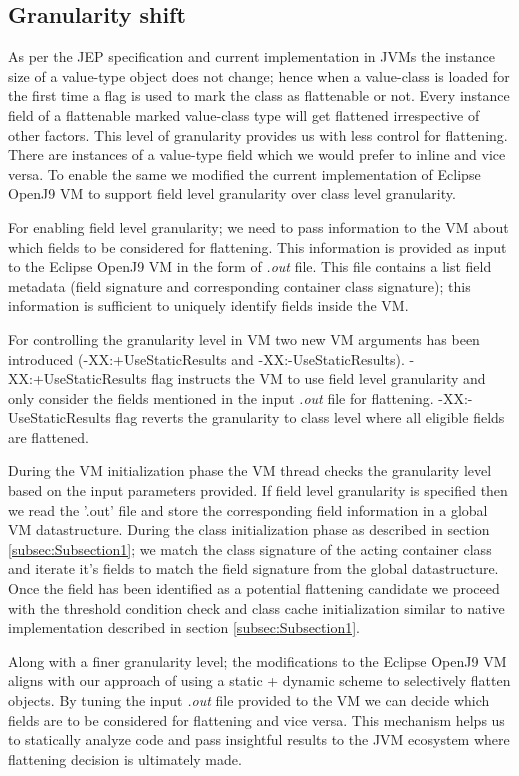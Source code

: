 \documentclass[12 pt, a4paper]{article}
\begin{document}
\subsection{Granularity shift}
As per the JEP \citep{JEPP} specification and current implementation in JVMs the instance size of a value-type object does not
change; hence when a value-class is loaded for the first time a flag is used to mark the class as flattenable or not. 
Every instance field of a flattenable marked value-class type will get flattened irrespective of other factors.
This level of granularity provides us with less control for flattening. There are instances of a value-type field which we
would prefer to inline and vice versa. To enable the same we modified the current implementation of Eclipse OpenJ9 VM to support field
level granularity over class level granularity. 

	For enabling field level granularity; we need to pass information to the VM about which fields to be considered for
flattening. This information is provided as input to the Eclipse OpenJ9 VM in the form of {\em .out} file. This file contains a list 
field metadata (field signature and corresponding container class signature); this information is sufficient to uniquely 
identify fields inside the VM.

	For controlling the granularity level in VM two new VM arguments has been introduced 
(-XX:+UseStaticResults and -XX:-UseStaticResults). -XX:+UseStaticResults flag 
instructs the VM to use field level granularity and only consider the fields mentioned in the input {\em .out} file for flattening.
-XX:-UseStaticResults flag reverts the granularity to class level where all eligible fields are flattened.

	During the VM initialization phase the VM thread checks the granularity level based on the input parameters provided.
If field level granularity is specified then we read the '.out' file and store the corresponding field information in a 
global VM datastructure. During the class initialization phase as described in section \ref{subsec:Subsection1}; we match the class signature of the
acting container class and iterate it's fields to match the field signature from the global datastructure.
Once the field has been identified as a potential flattening candidate we proceed with the threshold condition check and 
class cache initialization similar to native implementation described in section \ref{subsec:Subsection1}.

	Along with a finer granularity level; the modifications to the Eclipse OpenJ9 VM aligns with our 
approach of using a static +  dynamic scheme to selectively flatten objects. By tuning the input {\em .out} 
file provided to the VM we can decide which fields are to be considered for flattening and vice versa.
This mechanism helps us to statically analyze code and pass insightful results to the JVM ecosystem where
 flattening decision is ultimately made. 
\end{document}
